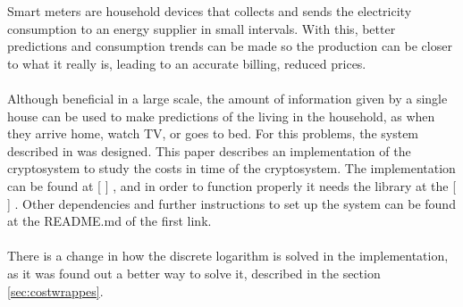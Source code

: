 
   Smart meters are household devices that collects and sends the electricity
   consumption to an energy supplier in small intervals. With this, better
   predictions and consumption trends can be made so the production can be closer to what it really is, leading to an accurate billing, reduced prices.\\
   \\
   Although beneficial in a large scale, the amount of information given by a single house can be used to make predictions of the living in the household, as when they arrive home, watch TV, or goes to bed. For this problems, the system described in \cite{recsi}
   was designed. This paper describes an implementation of the cryptosystem to study the costs in time of the cryptosystem. The implementation can be found at [ ]%
   , and in order to function properly it needs the library at the [ ]
   . Other dependencies and further instructions to set up the system can be found at the README.md of the first link.
   \\\\
   There is a change in how the discrete logarithm is solved in the implementation, as it was found out a better way to solve it, described in
   the section \ref{sec:costwrappes}.
   
